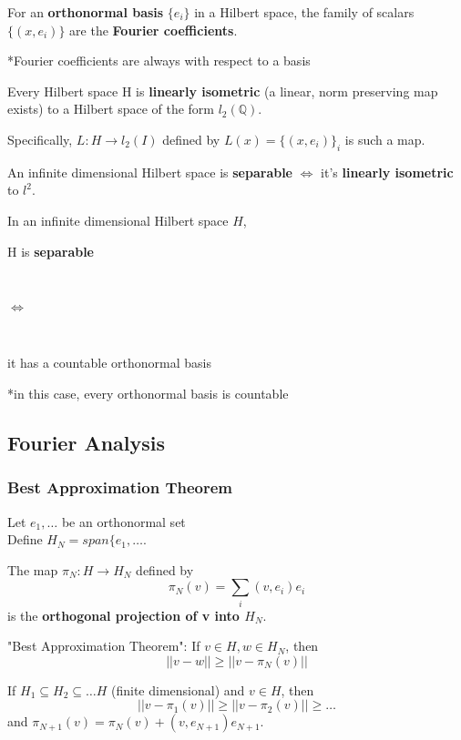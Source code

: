 \documentclass[a4paper, 12pt]{article}
\def\Q{\ensuremath{\mathbb{Q}}}
\newcommand{\bt}[1]{\textbf{#1}} %
\newcommand{\gray}[1]{{\leavevmode\color[gray]{0.5}{#1}}} %
\begin{document}
\begin{multicols}{2}
For an \bt{orthonormal basis} $\{e_i\}$ in a Hilbert space, 
the family of scalars $\{(x, e_i)\}$ are the \bt{Fourier coefficients}.

*Fourier coefficients are always with respect to a basis



Every Hilbert space H is \bt{linearly isometric} (a linear, norm preserving map exists)
to a Hilbert space of the form $l_2(\Q)$.

Specifically, $L: H \rightarrow l_2(I)$ defined by $L(x) = \{(x, e_i)\}_i$ is such a map.

An infinite dimensional Hilbert space is \bt{separable} $\iff$ it's \bt{linearly isometric} to $l^2$.

In an infinite dimensional Hilbert space $H$,  \\
\centerline{H is \bt{separable}} \\
\centerline{$\iff$}  \\
\centerline{it has a countable orthonormal basis}

*in this case, every orthonormal basis is countable \\
\gray{"if one then all"}

\subsection{Fourier Analysis}

\subsubsection{Best Approximation Theorem}

Let $e_1, \dots$ be an orthonormal set 
\gray{(not necessarily a basis)} \\
Define $H_N = span \{e_1, \dots$. 

The map $\pi_N: H \rightarrow H_N$ defined by 
$$\pi_N(v) = \sum_{i} (v, e_i) e_i$$
is the \bt{orthogonal projection of v into $H_N$}.\\
\gray{it's also a linear transformation and $(v - \pi_N(v)) \bot H_N$.}

"Best Approximation Theorem": If $v \in H, w \in H_N$, then 
$$|| v - w || \geq || v - \pi_N(v) ||$$
\gray{"$\pi_N(v)$ is the unique closest point to v in $H_N$"}

If $H_1 \subseteq H_2 \subseteq \dots H$ (finite dimensional) and $v \in H$, 
then 
$$|| v - \pi_1(v) || \geq || v - \pi_2(v) || \geq \dots$$
and 
$\pi_{N+1}(v) = \pi_N(v) + (v, e_{N+1})e_{N+1}$.


\end{multicols}
\end{document}
